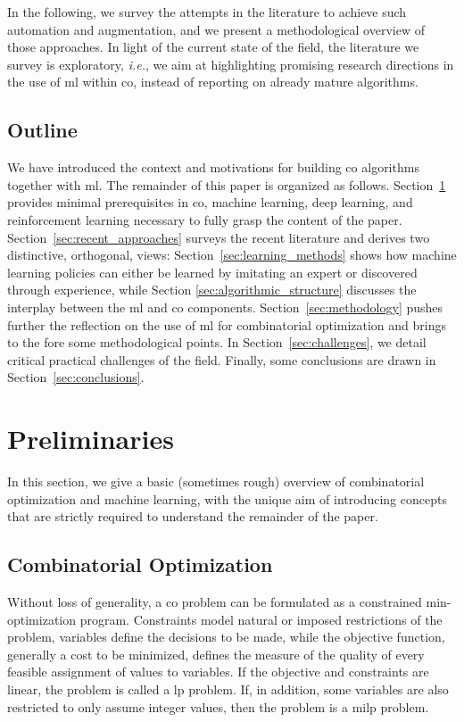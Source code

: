 \documentclass[11pt]{article}
\begin{document}
		In the following, we survey the attempts in the literature to achieve such automation and
		augmentation, and we present a methodological overview of those approaches.
		In light of the current state of the field, the literature we survey is exploratory, \textit{i.e.}, we aim at highlighting promising research
		directions in the use of \gls{ml} within \gls{co}, instead of reporting on already mature
		algorithms.

	\subsection{Outline}
		We have introduced the context and motivations for building \acrlong{co} algorithms together with
		\acrlong{ml}.
		The remainder of this paper is organized as follows.
		Section~\ref{sec:preliminaries} provides minimal prerequisites in \acrlong{co}, machine learning,
		deep learning, and reinforcement learning necessary to fully grasp the content of the paper.
		Section~\ref{sec:recent_approaches} surveys the recent literature and derives two distinctive,
		orthogonal, views: Section~\ref{sec:learning_methods} shows how machine learning policies can
		either be learned by imitating an expert or discovered through experience, while Section
		\ref{sec:algorithmic_structure} discusses the interplay between the \gls{ml} and \gls{co}
		components.
		Section~\ref{sec:methodology} pushes further the reflection on the use of \gls{ml} for combinatorial optimization and brings to the fore some methodological points.
		In Section~\ref{sec:challenges}, we detail critical practical challenges of the field.
		Finally, some conclusions are drawn in Section~\ref{sec:conclusions}.

\section{Preliminaries}
	\label{sec:preliminaries}

	In this section, we give a basic (sometimes rough) overview of combinatorial optimization and
	machine learning, with the unique aim of introducing concepts that are strictly required to
	understand the remainder of the paper.

	\subsection{Combinatorial Optimization}
		Without loss of generality, a \gls{co} problem can be formulated as a constrained min-optimization
		program.
		Constraints model natural or imposed restrictions of the problem, variables define the decisions to
		be made, while the objective function, generally a cost to be minimized, defines the measure of the
		quality of every feasible assignment of values to variables.
		If the objective and constraints are linear, the problem is called a \gls{lp} problem.
		If, in addition, some variables are also restricted to only assume integer values, then the problem
		is a \acrfull{milp} problem.
\end{document}
